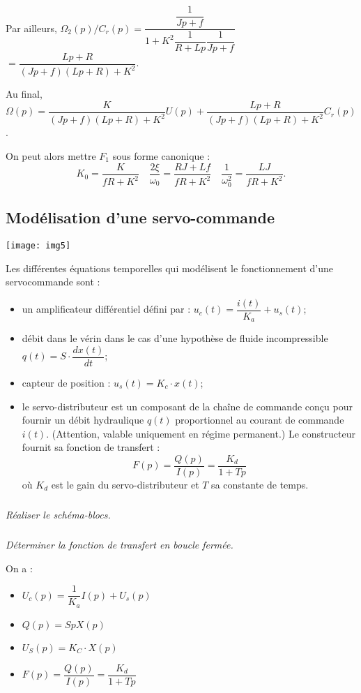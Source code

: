 \begin{multicols}{2}
\begin{corrige}
Par ailleurs, $\Omega_2(p)/C_r(p)=\dfrac{\dfrac{1}{Jp+f}}{1+K^2\dfrac{1}{R+Lp}\dfrac{1}{Jp+f}}$
$=\dfrac{Lp+R}{\left(Jp+f\right)\left(Lp+R\right)+K^2}$.


Au final, $\Omega(p)=\dfrac{K}{\left(Jp+f\right)\left(Lp+R\right)+K^2} U(p) + \dfrac{Lp+R}{\left(Jp+f\right)\left(Lp+R\right)+K^2} C_r(p)$. 

On peut alors mettre $F_1$ sous forme canonique : 
$$
K_0 =\dfrac{K}{fR+K^2}
\quad 
\dfrac{2\xi}{\omega_0} = \dfrac{RJ+Lf}{fR+K^2}
\quad
\dfrac{1}{\omega_0^2} =  \dfrac{LJ}{fR+K^2}.
$$
\end{corrige}
\else
\fi


\subsection*{Modélisation d'une servo-commande}

\setcounter{exo}{0}
\begin{center}
\texttt{[image: img5]}
\end{center}

Les différentes équations temporelles qui modélisent le fonctionnement d'une servocommande sont :
\begin{itemize}
\item un amplificateur différentiel défini par : $u_c(t)=\dfrac{i(t)}{K_a}+u_s(t)$;
\item débit dans le vérin dans le cas d'une hypothèse de fluide incompressible $q(t)=S\cdot\dfrac{dx(t)}{dt}$;
\item capteur de position : $u_s(t)=K_c\cdot x(t)$;
\item le servo-distributeur est un composant de la chaîne de commande conçu pour fournir un débit hydraulique $q(t)$ proportionnel au courant de commande $i(t)$. (Attention, valable uniquement en régime permanent.) Le constructeur fournit sa fonction de transfert :
$$
F(p)=\dfrac{Q(p)}{I(p)}=\dfrac{K_d}{1+Tp}
$$
où $K_d$ est le gain du servo-distributeur et $T$ sa constante de temps.
\end{itemize}

\subparagraph{}
\textit{Réaliser le schéma-blocs.}

\subparagraph{}
\textit{Déterminer la fonction de transfert en boucle fermée.}

\ifprof

\begin{corrige}
On a :
\begin{itemize}
\item $U_c(p)=\dfrac{1}{K_a}I(p)+U_s(p)$
\item $Q(p)=SpX(p)$
\item $U_S(p)=K_C\cdot X(p)$
\item $F(p)=\dfrac{Q(p)}{I(p)}=\dfrac{K_d}{1+Tp}$
\end{itemize}



\end{corrige}
\end{multicols}
